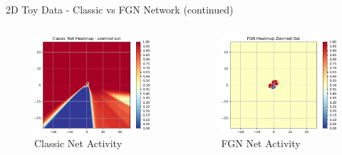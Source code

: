 \documentclass{beamer}
\begin{document}
\begin{frame}{2D Toy Data - Classic vs FGN Network (continued)}
\begin{columns}
    \begin{column}{.333\textwidth}
    \begin{figure}
        \centering
        \includegraphics[width=1.\textwidth]{images/2D-network-toy/classic-heatmap-zoomed-out.png}
        \caption*{Classic Net Activity}
    \end{figure}
    \end{column}
    
    \begin{column}{.333\textwidth}
    \begin{figure}
        \centering
        \includegraphics[width=1.\textwidth]{images/2D-network-toy/fgn-heatmap-zoomed-out.png}
        \caption*{FGN Net Activity}
    \end{figure}
    \end{column}
    \end{columns}
    
\end{frame}
\end{document}
